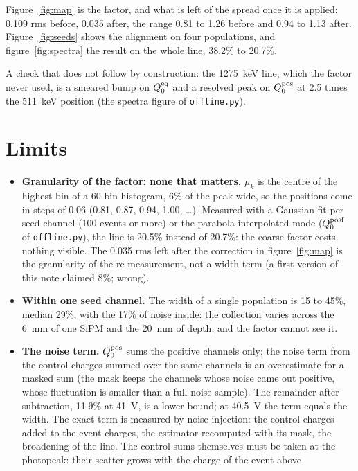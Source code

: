 \documentclass[11pt]{article}
\newcommand{\code}[1]{\texttt{#1}}
\begin{document}
Figure~\ref{fig:map} is the factor, and what is left of the spread once
it is applied: 0.109 rms before, 0.035 after, the range 0.81 to 1.26
before and 0.94 to 1.13 after. Figure~\ref{fig:seeds} shows the
alignment on four populations, and figure~\ref{fig:spectra} the result on
the whole line, 38.2\% to 20.7\%.

A check that does not follow by construction: the 1275~keV line, which
the factor never used, is a smeared bump on $Q^{\rm eq}_0$ and a resolved
peak on $Q^{\rm pos}_0$ at 2.5 times the 511~keV position (the spectra
figure of \code{offline.py}).

\section{Limits}

\begin{itemize}
\item \textbf{Granularity of the factor: none that matters.} $\mu_k$ is
  the centre of the highest bin of a 60-bin histogram, 6\% of the peak
  wide, so the positions come in steps of 0.06 (0.81, 0.87, 0.94, 1.00,
  \dots). Measured with a Gaussian fit per seed channel (100 events or
  more) or the parabola-interpolated mode ($Q^{\rm posf}_0$ of
  \code{offline.py}), the line is 20.5\% instead of 20.7\%: the coarse
  factor costs nothing visible. The 0.035 rms left after the correction
  in figure~\ref{fig:map} is the granularity of the re-measurement, not
  a width term (a first version of this note claimed 8\%; wrong).
\item \textbf{Within one seed channel.} The width of a single population
  is 15 to 45\%, median 29\%, with the 17\% of noise inside: the
  collection varies across the 6~mm of one SiPM and the 20~mm of depth,
  and the factor cannot see it.
\item \textbf{The noise term.} $Q^{\rm pos}_0$ sums the positive channels
  only; the noise term from the control charges summed over the same
  channels is an overestimate for a masked sum (the mask keeps the
  channels whose noise came out positive, whose fluctuation is smaller
  than a full noise sample). The remainder after subtraction, 11.9\% at
  41~V, is a lower bound; at 40.5~V the term equals the width. The exact
  term is measured by noise injection: the control charges added to the
  event charges, the estimator recomputed with its mask, the broadening
  of the line. The control sums themselves must be taken at the
  photopeak: their scatter grows with the charge of the event above

\end{itemize}
\end{document}
